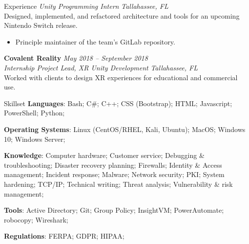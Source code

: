 \documentclass{resume} %
\begin{document}
\begin{rSection}{Experience}
		\textit{Unity Programming Intern} \hfill {\em Tallahassee, FL} \smallskip \\
		Designed, implemented, and refactored architecture and tools for an upcoming Nintendo Switch release.
		\begin{itemize}
			\vspace{-0.2cm} \item Principle maintainer of the team's GitLab repository.
		\end{itemize}
		{\bf Covalent Reality} \hfill {\em May 2018 – September 2018}\\
		\textit{Internship Project Lead, XR Unity Development} \hfill {\em Tallahassee, FL} \smallskip \\
		Worked with clients to design XR experiences for educational and commercial use.
	\end{rSection}
	

	
	\begin{rSection}{Skillset}
		\textbf{Languages}: Bash; C\#; C++; CSS (Bootstrap); HTML; Javascript; PowerShell; Python;
		
		\textbf{Operating Systems}: Linux (CentOS/RHEL, Kali, Ubuntu); MacOS; Windows 10; Windows Server;
		
		\textbf{Knowledge}: Computer hardware; Customer service; Debugging \& troubleshooting; Disaster recovery planning; Firewalls; Identity \& Access management; Incident response; Malware; Network security; PKI; System hardening; TCP/IP; Technical writing; Threat analysis; Vulnerability \& risk management;
		
		\textbf{Tools}: Active Directory; Git; Group Policy; InsightVM; PowerAutomate; robocopy; Wireshark;
		
		\textbf{Regulations}: FERPA; GDPR; HIPAA;
	\end{rSection}

	
		
	
	
\end{document}
